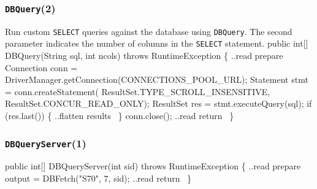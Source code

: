 \documentclass{article}
\def\nwendcode{\endtrivlist \endgroup}      %
\let\nwdocspar=\par
\theoremstyle{definition}                   %
\begin{document}
\subsubsection{{\tt{}DBQuery}(2)}
Run custom {\tt{}SELECT} queries against the database using {\tt{}DBQuery}. The
second parameter indicates the number of columns in the {\tt{}SELECT} statement.
\nwenddocs{}\endmoddef{}
public int[] DBQuery(String sql, int ncols) throws RuntimeException \{
  \LA{}..read prepare~{\nwtagstyle{}}\RA{}
  Connection conn = DriverManager.getConnection(CONNECTIONS_POOL_URL);
  Statement stmt = conn.createStatement(
    ResultSet.TYPE_SCROLL_INSENSITIVE, ResultSet.CONCUR_READ_ONLY);
  ResultSet res = stmt.executeQuery(sql);
  if (res.last()) \{
    \LA{}..flatten results~{\nwtagstyle{}}\RA{}
  \}
  conn.close();
  \LA{}..read return~{\nwtagstyle{}}\RA{}
\}
\nwendcode{}%

\subsubsection{{\tt{}\protect{}\protect{}DBQueryServer}(1)}
\nwenddocs{}\endmoddef{}
public int[] DBQueryServer(int sid) throws RuntimeException \{
  \LA{}..read prepare~{\nwtagstyle{}}\RA{}
  output = DBFetch("S70", 7, sid);
  \LA{}..read return~{\nwtagstyle{}}\RA{}
\}
\eatline
{}\nwendcode{}\nwdocspar
\end{document}
